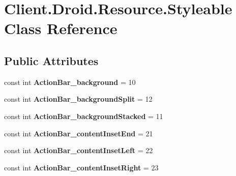 \hypertarget{classClient_1_1Droid_1_1Resource_1_1Styleable}{}\section{Client.\+Droid.\+Resource.\+Styleable Class Reference}
\label{classClient_1_1Droid_1_1Resource_1_1Styleable}
\subsection*{Public Attributes}
\begin{DoxyCompactItemize}
\item 
\hypertarget{classClient_1_1Droid_1_1Resource_1_1Styleable_a6b9557a5aa897e79fd04a9f3faa59d7e}{}const int {\bfseries Action\+Bar\+\_\+background} = 10\label{classClient_1_1Droid_1_1Resource_1_1Styleable_a6b9557a5aa897e79fd04a9f3faa59d7e}

\item 
\hypertarget{classClient_1_1Droid_1_1Resource_1_1Styleable_af13f76138eef5b75561ef5f855c478b9}{}const int {\bfseries Action\+Bar\+\_\+background\+Split} = 12\label{classClient_1_1Droid_1_1Resource_1_1Styleable_af13f76138eef5b75561ef5f855c478b9}

\item 
\hypertarget{classClient_1_1Droid_1_1Resource_1_1Styleable_a70a006567b4dfce2244418e4eb59b037}{}const int {\bfseries Action\+Bar\+\_\+background\+Stacked} = 11\label{classClient_1_1Droid_1_1Resource_1_1Styleable_a70a006567b4dfce2244418e4eb59b037}

\item 
\hypertarget{classClient_1_1Droid_1_1Resource_1_1Styleable_a7cdd384345f571b3b780ab8e5ad53796}{}const int {\bfseries Action\+Bar\+\_\+content\+Inset\+End} = 21\label{classClient_1_1Droid_1_1Resource_1_1Styleable_a7cdd384345f571b3b780ab8e5ad53796}

\item 
\hypertarget{classClient_1_1Droid_1_1Resource_1_1Styleable_a8faf9054a449f3f6a5d40af22786ef8d}{}const int {\bfseries Action\+Bar\+\_\+content\+Inset\+Left} = 22\label{classClient_1_1Droid_1_1Resource_1_1Styleable_a8faf9054a449f3f6a5d40af22786ef8d}

\item 
\hypertarget{classClient_1_1Droid_1_1Resource_1_1Styleable_a8d2ca4ad50dfaea3ea9136d155a0a074}{}const int {\bfseries Action\+Bar\+\_\+content\+Inset\+Right} = 23\label{classClient_1_1Droid_1_1Resource_1_1Styleable_a8d2ca4ad50dfaea3ea9136d155a0a074}


\end{DoxyCompactItemize}
